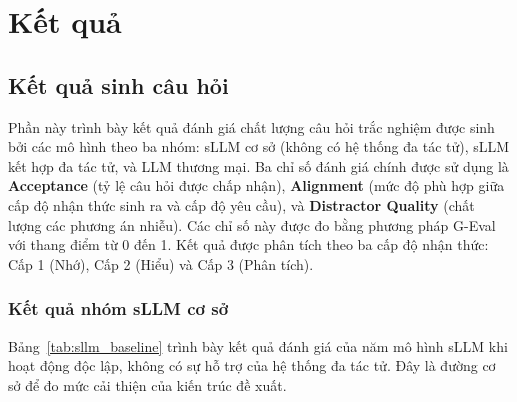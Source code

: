 \chapter{Kết quả}
\label{chap:ket-qua}

\section{Kết quả sinh câu hỏi}

Phần này trình bày kết quả đánh giá chất lượng câu hỏi trắc nghiệm được sinh bởi các mô hình theo ba nhóm: sLLM cơ sở (không có hệ thống đa tác tử), sLLM kết hợp đa tác tử, và LLM thương mại. Ba chỉ số đánh giá chính được sử dụng là \textbf{Acceptance} (tỷ lệ câu hỏi được chấp nhận), \textbf{Alignment} (mức độ phù hợp giữa cấp độ nhận thức sinh ra và cấp độ yêu cầu), và \textbf{Distractor Quality} (chất lượng các phương án nhiễu). Các chỉ số này được đo bằng phương pháp G-Eval với thang điểm từ 0 đến 1. Kết quả được phân tích theo ba cấp độ nhận thức: Cấp 1 (Nhớ), Cấp 2 (Hiểu) và Cấp 3 (Phân tích).

\subsection{Kết quả nhóm sLLM cơ sở}

Bảng~\ref{tab:sllm_baseline} trình bày kết quả đánh giá của năm mô hình sLLM khi hoạt động độc lập, không có sự hỗ trợ của hệ thống đa tác tử. Đây là đường cơ sở để đo mức cải thiện của kiến trúc đề xuất.

\begin{table}[htbp]
\centering
\caption{Kết quả đánh giá nhóm sLLM cơ sở trên bộ dữ liệu RACE-High}
\label{tab:sllm_baseline}
\end{table}

